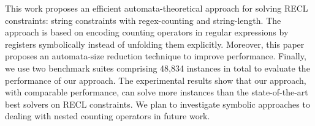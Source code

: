 %

This work proposes an efficient automata-theoretical approach for solving RECL constraints: string constraints with regex-counting and string-length. The approach is based on encoding counting operators in regular expressions by registers symbolically instead of unfolding them explicitly. Moreover, this paper proposes an automata-size reduction technique to improve performance. Finally, we use two benchmark suites comprising 48,834 instances in total to evaluate the performance of our approach. The experimental results show that our approach, with comparable performance, can solve more instances than the state-of-the-art best solvers on RECL constraints. We plan to investigate symbolic approaches to dealing with nested counting operators in future work. 




%